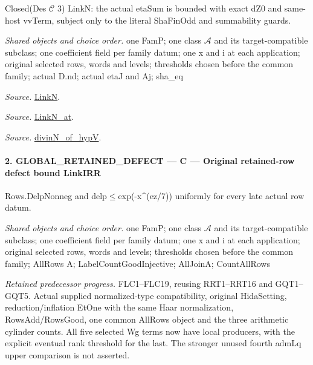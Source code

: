 \documentclass[11pt,a4paper]{article}
\numberwithin{equation}{section}
\theoremstyle{remark}\newtheorem{remark}[theorem]{Remark}
\begin{document}
Closed(Des $\mathcal C$ 3) LinkN: the actual etaSum is bounded with exact dZ0 and same-host vvTerm, subject only to the literal ShaFinOdd and summability guards.

\emph{Shared objects and choice order.} one FamP; one class $\mathcal A$ and its target-compatible subclass; one coefficient field per family datum; one x and i at each application; original selected rows, words and levels; thresholds chosen before the common family; actual D.nd; actual etaJ and Aj; sha\_\allowbreak eq

\emph{Source.} \href{https://github.com/CocoSgt/riemann-hypothesis-lean/blob/7cbf7a0c32fca1badf05931879a37c3f8a2b03b4/src/Formalism/SharpRestriction/GlobalTheoremInputs.lean#L45-L48}{LinkN}.

\emph{Source.} \href{https://github.com/CocoSgt/riemann-hypothesis-lean/blob/7cbf7a0c32fca1badf05931879a37c3f8a2b03b4/src/Formalism/SharpRestriction/GlobalTheoremInputs.lean#L40-L44}{LinkN\_\allowbreak at}.

\emph{Source.} \href{https://github.com/CocoSgt/riemann-hypothesis-lean/blob/7cbf7a0c32fca1badf05931879a37c3f8a2b03b4/src/Development/AutomorphicArithmetic/CharacterBoxes/DivinNOfHypV.lean#L117-L134}{divinN\_\allowbreak of\_\allowbreak hypV}.



\paragraph{2. GLOBAL\_\allowbreak RETAINED\_\allowbreak DEFECT — C — Original retained-row defect bound LinkIRR}

Rows.DelpNonneg and delp$\le$exp(-x\textasciicircum{}(ez/7)) uniformly for every late actual row datum.

\emph{Shared objects and choice order.} one FamP; one class $\mathcal A$ and its target-compatible subclass; one coefficient field per family datum; one x and i at each application; original selected rows, words and levels; thresholds chosen before the common family; AllRows A; LabelCountGoodInjective; AllJoinA; CountAllRows

\emph{Retained predecessor progress.} FLC1–FLC19, reusing RRT1–RRT16 and GQT1–GQT5. Actual supplied normalized-type compatibility, original HidaSetting, reduction/inflation EtOne with the same Haar normalization, RowsAdd/RowsGood, one common AllRows object and the three arithmetic cylinder counts. All five selected Wg terms now have local producers, with the explicit eventual rank threshold for the last. The stronger unused fourth admLq upper comparison is not asserted.
\end{document}
